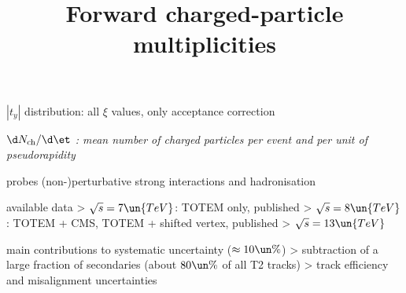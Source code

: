 \newpage %

\> $|t_y|$ distribution: all $\xi$ values, only acceptance correction


\newpage %
\title{Forward charged-particle multiplicities}

\> \em{$\d N_{\rm ch} / \d\et$} : mean number of charged particles per event and per unit of pseudorapidity

\> probes (non-)perturbative strong interactions and hadronisation 


\centerline{
}

\> available data
\>> $\sqrt s = 7\un{TeV}$: TOTEM only, published
\>> $\sqrt s = 8\un{TeV}$: TOTEM + CMS, TOTEM + shifted vertex, published
\>> $\sqrt s = 13\un{TeV}$ 


\newpage %


\centerline{
	\hskip3mm
}

\> main contributions to systematic uncertainty ($\approx 10\un{\%}$)
\>> subtraction of a large fraction of secondaries (about $80\un{\%}$ of all T2 tracks)
\>> track efficiency and misalignment uncertainties

